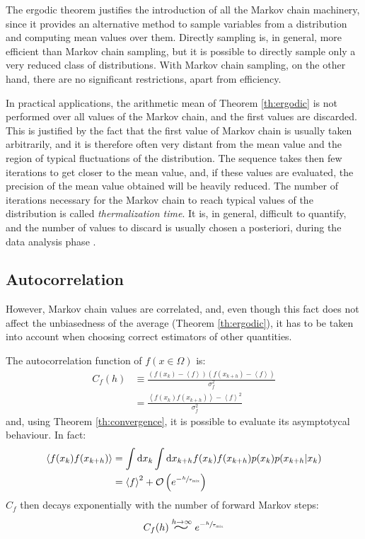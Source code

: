The ergodic theorem justifies the introduction of all the Markov chain machinery,
since it provides an alternative method to sample variables from a distribution and computing mean values over them.
Directly sampling is, in general, more efficient than Markov chain sampling,
but it is possible to directly sample only a very reduced class of distributions.
With Markov chain sampling, on the other hand, there are no significant restrictions, apart from efficiency.

In practical applications, the arithmetic mean of Theorem \ref{th:ergodic} is not performed over all values of the Markov chain,
and the first values are discarded.
This is justified by the fact that the first value of Markov chain is usually taken arbitrarily,
and it is therefore often very distant from the mean value and the region of typical fluctuations of the distribution.
The sequence takes then few iterations to get closer to the mean value, and, if these values are evaluated,
the precision of the mean value obtained will be heavily reduced.
The number of iterations necessary for the Markov chain to reach typical values of the distribution is called \emph{thermalization time}.
It is, in general, difficult to quantify, and the number of values to discard is usually chosen a posteriori, during the data analysis phase \cite{numerical_recipes}.


\subsection*{Autocorrelation}
However, Markov chain values are correlated,
and, even though this fact does not affect the unbiasedness of the average (Theorem \ref{th:ergodic}),
it has to be taken into account when choosing correct estimators of other quantities.%

The autocorrelation function of $f(x\in\Omega)$ is:
\begin{align*}
    C_f(h) &\equiv \frac{(f(x_k)-\left<f\right>)(f(x_{k+h})-\left<f\right>)}{\sigma_f^2} \\
           &= \frac{\left<f(x_k)f(x_{k+h})\right>-\left<f\right>^2}{\sigma_f^2}
\end{align*}
and, using Theorem \ref{th:convergence}, it is possible to evaluate its asymptotycal behaviour.
In fact:
\begin{align*}
    \left<f(x_k)f(x_{k+h})\right> &= \int\mathrm dx_k\int\mathrm dx_{k+h}f(x_k)f(x_{k+h})p(x_k)p(x_{k+h}|x_k) \\
                                  &= \left<f\right>^2 + \mathcal O\left(e^{-\sfrac{h}{\tau_\mathrm{mix}}}\right)
\end{align*}
$C_f$ then decays exponentially with the number of forward Markov steps:
\begin{equation}\label{eq:autocorr_decay}
    C_f(h) \stackrel{h\to\infty}{\scalebox{2}[1.25]{$\sim$}} e^{-\sfrac{h}{\tau_\mathrm{mix}}}
\end{equation}


